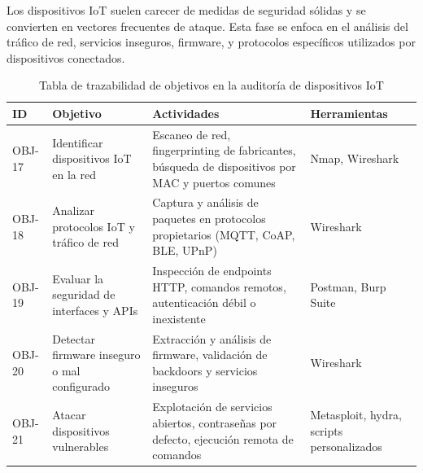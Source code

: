 \documentclass[a4paper, 10pt]{article}
\begin{document}
Los dispositivos IoT suelen carecer de medidas de seguridad sólidas y se convierten en vectores frecuentes de ataque. Esta fase se enfoca en el análisis del tráfico de red, servicios inseguros, firmware, y protocolos específicos utilizados por dispositivos conectados.

\begin{table}[H]
\centering
\renewcommand{\arraystretch}{1.4}
    \begin{tabular}{|p{1.2cm}|p{3.9cm}|p{5.3cm}|p{4.2cm}|}
\hline
\textbf{ID} & \textbf{Objetivo} & \textbf{Actividades} & \textbf{Herramientas}  \\
\hline
OBJ-17 & Identificar dispositivos IoT en la red & Escaneo de red, fingerprinting de fabricantes, búsqueda de dispositivos por MAC y puertos comunes & Nmap, Wireshark  \\
\hline
OBJ-18 & Analizar protocolos IoT y tráfico de red & Captura y análisis de paquetes en protocolos propietarios (MQTT, CoAP, BLE, UPnP) & Wireshark  \\
\hline
OBJ-19 & Evaluar la seguridad de interfaces y APIs & Inspección de endpoints HTTP, comandos remotos, autenticación débil o inexistente & Postman, Burp Suite  \\
\hline
OBJ-20 & Detectar firmware inseguro o mal configurado & Extracción y análisis de firmware, validación de backdoors y servicios inseguros & Wireshark  \\
\hline
OBJ-21 & Atacar dispositivos vulnerables & Explotación de servicios abiertos, contraseñas por defecto, ejecución remota de comandos & Metasploit, hydra, scripts personalizados  \\
\hline
\end{tabular}
\caption{Tabla de trazabilidad de objetivos en la auditoría de dispositivos IoT}
\end{table}
\end{document}
